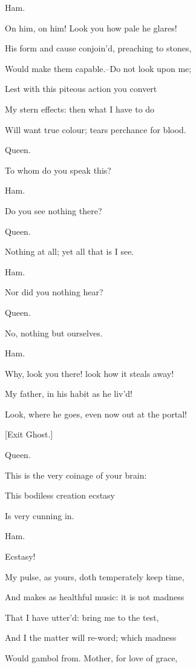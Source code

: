 \documentclass[12pt]{book}
\begin{document}
Ham.

On him, on him! Look you how pale he glares!

His form and cause conjoin'd, preaching to stones,

Would make them capable.--Do not look upon me;

Lest with this piteous action you convert

My stern effects: then what I have to do

Will want true colour; tears perchance for blood.



Queen.

To whom do you speak this?



Ham.

Do you see nothing there?



Queen.

Nothing at all; yet all that is I see.



Ham.

Nor did you nothing hear?



Queen.

No, nothing but ourselves.



Ham.

Why, look you there! look how it steals away!

My father, in his habit as he liv'd!

Look, where he goes, even now out at the portal!



[Exit Ghost.]



Queen.

This is the very coinage of your brain:

This bodiless creation ecstasy

Is very cunning in.



Ham.

Ecstasy!

My pulse, as yours, doth temperately keep time,

And makes as healthful music: it is not madness

That I have utter'd: bring me to the test,

And I the matter will re-word; which madness

Would gambol from. Mother, for love of grace,
\end{document}
